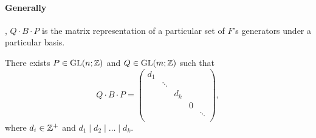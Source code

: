 \paragraph{Generally}, \(Q\cdot B\cdot P\) is the matrix representation of a particular set of \(F\)'s generators under a particular basis.

\begin{proposition}\label{prop:appendix-1}
	There exists \(P\in \mathrm{GL}(n; \mathbb{\MakeUppercase{z}} ) \) and \(Q\in \mathrm{GL}(m; \mathbb{\MakeUppercase{z}} ) \) such that
	\[
		Q\cdot B\cdot P = \begin{pmatrix}
			d_1 &        &       &   &        \\
			    & \ddots &       &   &        \\
			    &        & d_{k} &   &        \\
			    &        &       & 0 &        \\
			    &        &       &   & \ddots \\
		\end{pmatrix},
	\]
	where \(d_{i} \in \mathbb{\MakeUppercase{z}} ^+\) and \(d_1 \mid d_2 \mid \ldots \mid d_{k}  \).
\end{proposition}
